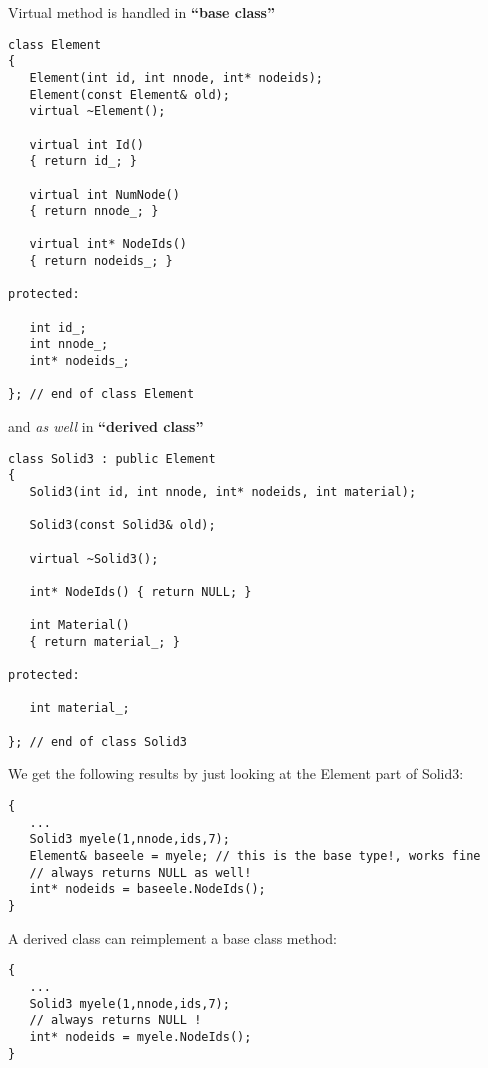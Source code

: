 Virtual  method is handled in \textbf{``base class''}\\
\begin{boxedminipage}{\linewidth}
\begin{verbatim}
class Element
{
   Element(int id, int nnode, int* nodeids);
   Element(const Element& old);
   virtual ~Element();

   virtual int Id()
   { return id_; }

   virtual int NumNode()
   { return nnode_; }

   virtual int* NodeIds()
   { return nodeids_; }

protected:

   int id_;
   int nnode_;
   int* nodeids_;

}; // end of class Element
\end{verbatim}
\end{boxedminipage}
and \emph{as well} in \textbf{``derived class''}\\
\begin{boxedminipage}{\linewidth}
\begin{verbatim}
class Solid3 : public Element
{
   Solid3(int id, int nnode, int* nodeids, int material);

   Solid3(const Solid3& old);

   virtual ~Solid3();

   int* NodeIds() { return NULL; }

   int Material()
   { return material_; }

protected:

   int material_;

}; // end of class Solid3
\end{verbatim}
\end{boxedminipage}
We get the following results by just looking at the Element part of Solid3:\\
\begin{boxedminipage}{\linewidth}
\begin{verbatim}
{
   ...
   Solid3 myele(1,nnode,ids,7);
   Element& baseele = myele; // this is the base type!, works fine
   // always returns NULL as well!
   int* nodeids = baseele.NodeIds();
}
\end{verbatim}
\end{boxedminipage}
A derived class can reimplement a base class method:\\
\begin{boxedminipage}{\linewidth}
\begin{verbatim}
{
   ...
   Solid3 myele(1,nnode,ids,7);
   // always returns NULL !
   int* nodeids = myele.NodeIds();
}
\end{verbatim}
\end{boxedminipage}
